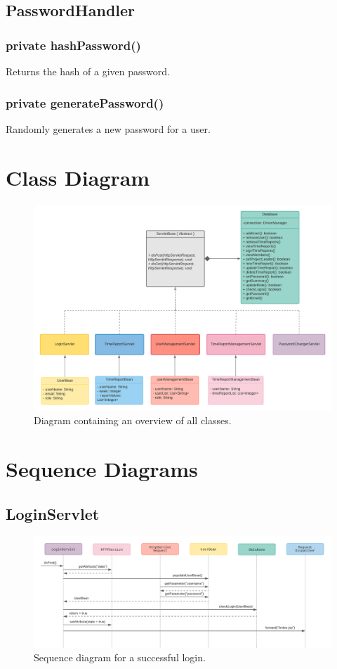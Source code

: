 \documentclass{article}
\begin{document}
\subsection{PasswordHandler}
\subsubsection{private hashPassword()}
Returns the hash of a given password.
\subsubsection{private generatePassword()}
Randomly generates a new password for a user.

\section{Class Diagram}

\begin{figure}[H]
    \centering
    \includegraphics[scale=0.5]{images/ClassDiagram.png}
    \caption{Diagram containing an overview of all classes.}
    \label{fig:classDiagram}
\end{figure}


\section{Sequence Diagrams}
\subsection{LoginServlet}

\begin{figure}[H]
    \centering
    \includegraphics[scale=0.6]{images/successfulLogin.png}
    \caption{Sequence diagram for a successful login.}
    \label{fig:successfulLogin}
\end{figure}
\end{document}
